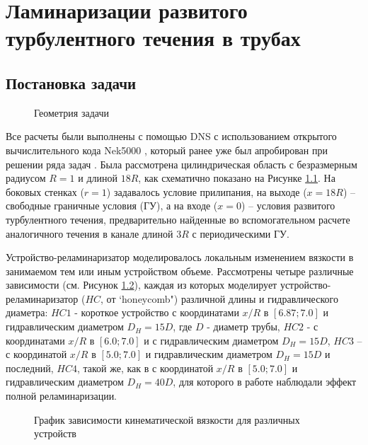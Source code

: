 \chapter{Ламинаризации развитого турбулентного течения в трубах}\label{ch:ch3}
%

\section{Постановка задачи}\label{ch3:problem}

%
\begin{figure}[ht]
    \caption{Геометрия задачи}\label{ch3:fig:geom}
\end{figure}
%
%
Все расчеты были выполнены с помощью DNS с использованием открытого вычислительного кода Nek5000 \cite{nek}, 
который ранее уже был апробирован при решении ряда задач 
\cite{zaripov2021mechanism,zaripov2021reverse,ivashchenko2021effect}. 
%
Была рассмотрена цилиндрическая область с безразмерным радиусом $R = 1$ и длиной $18R$, 
как схематично показано на Рисунке \ref{ch3:fig:geom}. 
%
На боковых стенках ($r = 1$) задавалось условие прилипания, на выходе ($x = 18R$) -- 
свободные граничные условия (ГУ), а на входе ($x = 0$) -- условия развитого турбулентного течения, 
предварительно найденные во вспомогательном расчете аналогичного течения в канале длиной $3R$ с периодическими ГУ. 

Устройство-реламинаризатор моделировалось локальным изменением вязкости в 
занимаемом тем или иным устройством объеме. 
%
Рассмотрены четыре различные зависимости (см. Рисунок \ref{ch3:fig:visc}), 
каждая из которых моделирует устройство-реламинаризатор ($HC$, от `honeycomb") 
различной длины и гидравлического диаметра: 
$HC1$ - короткое устройство с координатами $x/R$ в $[6.87;7.0]$ и гидравлическим диаметром $D_H = 15D$, 
где $D$ - диаметр трубы, 
$HC2$ - с координатами $x/R$ в $[6.0;7.0]$ и с гидравлическим диаметром $D_H = 15D$, 
$HC3$ -- с координатой $x/R$ в $[5.0;7.0]$ и гидравлическим диаметром $D_H = 15D$ и последний, 
$HC4$, такой же, как в \cite{kuhnen2019relaminarization} с координатой $x/R$ в $[5.0;7.0]$ и гидравлическим диаметром $D_H = 40D$, 
для которого в работе \cite{kuhnen2019relaminarization} наблюдали эффект полной реламинаризации.
%
\begin{figure}[ht]
    \caption{График зависимости кинематической вязкости для различных устройств}\label{ch3:fig:visc}
\end{figure}
%


